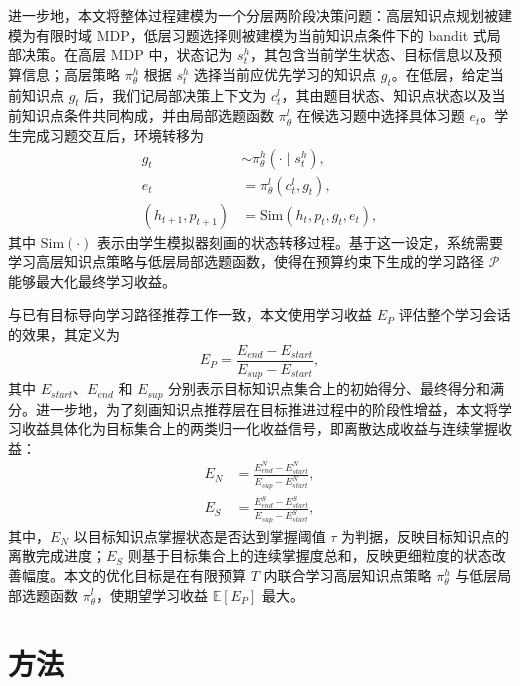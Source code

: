 \documentclass[11pt,a4paper]{article}
\begin{document}
进一步地，本文将整体过程建模为一个分层两阶段决策问题：高层知识点规划被建模为有限时域 MDP，低层习题选择则被建模为当前知识点条件下的 bandit 式局部决策。在高层 MDP 中，状态记为 $s_t^h$，其包含当前学生状态、目标信息以及预算信息；高层策略 $\pi^h_\theta$ 根据 $s_t^h$ 选择当前应优先学习的知识点 $g_t$。在低层，给定当前知识点 $g_t$ 后，我们记局部决策上下文为 $c_t^l$，其由题目状态、知识点状态以及当前知识点条件共同构成，并由局部选题函数 $\pi^l_\theta$ 在候选习题中选择具体习题 $e_t$。学生完成习题交互后，环境转移为
\begin{equation}
\begin{aligned}
g_t &\sim \pi^h_\theta(\cdot\mid s_t^h),\\
e_t &= \pi^l_\theta(c_t^l,g_t),\\
(h_{t+1},p_{t+1}) &= \mathrm{Sim}(h_t,p_t,g_t,e_t),
\end{aligned}
\end{equation}
其中 $\mathrm{Sim}(\cdot)$ 表示由学生模拟器\cite{liu2019exploiting}刻画的状态转移过程。基于这一设定，系统需要学习高层知识点策略与低层局部选题函数，使得在预算约束下生成的学习路径 $\mathcal{P}$ 能够最大化最终学习收益。

与已有目标导向学习路径推荐工作一致，本文使用学习收益 $E_P$ 评估整个学习会话的效果，其定义为
\begin{equation}
E_P=\frac{E_{end}-E_{start}}{E_{sup}-E_{start}},
\end{equation}
其中 $E_{start}$、$E_{end}$ 和 $E_{sup}$ 分别表示目标知识点集合上的初始得分、最终得分和满分。进一步地，为了刻画知识点推荐层在目标推进过程中的阶段性增益，本文将学习收益具体化为目标集合上的两类归一化收益信号，即离散达成收益与连续掌握收益：
\begin{equation}
\begin{aligned}
E_N
&=
\frac{E_{end}^{N}-E_{start}^{N}}{E_{sup}-E_{start}^{N}},\\
E_S
&=
\frac{E_{end}^{S}-E_{start}^{S}}{E_{sup}-E_{start}^{S}},
\end{aligned}
\end{equation}
其中，$E_N$ 以目标知识点掌握状态是否达到掌握阈值 $\tau$ 为判据，反映目标知识点的离散完成进度；$E_S$ 则基于目标集合上的连续掌握度总和，反映更细粒度的状态改善幅度。本文的优化目标是在有限预算 $T$ 内联合学习高层知识点策略 $\pi^h_\theta$ 与低层局部选题函数 $\pi^l_\theta$，使期望学习收益 $\mathbb{E}[E_P]$ 最大。

\section{方法}
\end{document}
